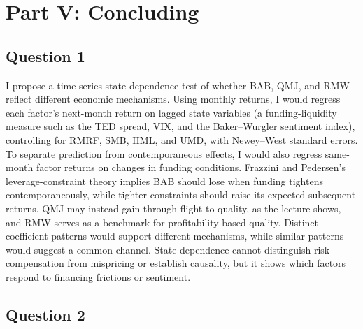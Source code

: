 
\section{Part V: Concluding}

\subsection*{Question 1}
I propose a time-series state-dependence test of whether BAB, QMJ, and RMW reflect different economic mechanisms. Using monthly returns, I would regress each factor's next-month return on lagged state variables (a funding-liquidity measure such as the TED spread, VIX, and the Baker--Wurgler sentiment index), controlling for RMRF, SMB, HML, and UMD, with Newey--West standard errors. To separate prediction from contemporaneous effects, I would also regress same-month factor returns on changes in funding conditions. Frazzini and Pedersen's leverage-constraint theory implies BAB should lose when funding tightens contemporaneously, while tighter constraints should raise its expected subsequent returns. QMJ may instead gain through flight to quality, as the lecture shows, and RMW serves as a benchmark for profitability-based quality. Distinct coefficient patterns would support different mechanisms, while similar patterns would suggest a common channel. State dependence cannot distinguish risk compensation from mispricing or establish causality, but it shows which factors respond to financing frictions or sentiment.

\subsection*{Question 2}

